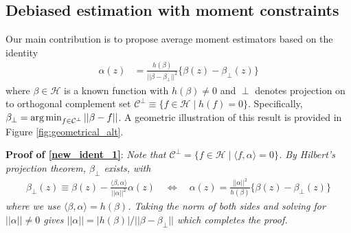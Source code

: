 


\subsection{Debiased estimation with moment constraints}

Our main contribution is to propose average moment estimators based on the identity
\begin{align}
    \alpha(z) &= \frac{h(\beta)}{||\beta-\beta_\perp||^2}\{\beta(z) - \beta_\perp(z)\} \label{new_ident_1}
\end{align}
where $\beta \in \mathcal{H}$ is a known function with $h(\beta) \neq 0$ and $\perp$ denotes projection on to orthogonal complement set $\mathcal{C}^\perp \equiv \{f\in \mathcal{H} \mid  h(f) = 0 \}$. Specifically, $\beta_\perp = \operatorname*{arg\,min}_{f \in \mathcal{C}^\perp} ||\beta - f||$. A geometric illustration of this result is provided in Figure \ref{fig:geometrical_alt}.

\textbf{Proof of \eqref{new_ident_1}}:
\textit{
Note that $\mathcal{C}^\perp = \{f\in \mathcal{H} \mid  \langle f, \alpha \rangle = 0 \}$. By Hilbert's projection theorem, $\beta_\perp$ exists, with
\begin{align*}
    \beta_\perp(z) \equiv \beta(z) - \frac{\langle \beta, \alpha \rangle}{||\alpha||^2} \alpha(z) \quad\iff\quad \alpha(z) = \frac{||\alpha||^2}{h(\beta)}\{\beta(z) - \beta_\perp(z)\}
\end{align*}
where we use $\langle \beta, \alpha \rangle = h(\beta)$. Taking the norm of both sides and solving for $||\alpha|| \neq 0$ gives $||\alpha|| = |h(\beta)|/||\beta-\beta_\perp||$ which completes the proof.
}

